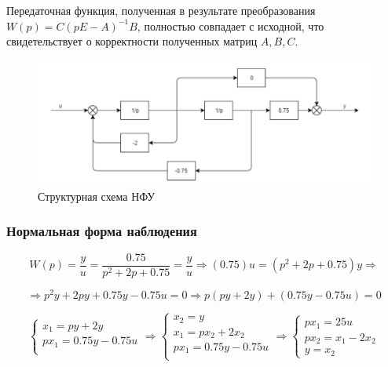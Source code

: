 \documentclass[14pt,a4paper,report]{report}
\begin{document}
Передаточная функция, полученная в результате преобразования $W(p)=C(pE-A)^{-1}B$, полностью совпадает с исходной, что свидетельствует о корректности полученных матриц  $A, B, C$. 

\begin{figure}[h!]
	\centering
	\includegraphics[scale = 0.55]{images/nfu.png}
	\caption{Структурная схема НФУ}
	\label{image:1}
\end{figure}
\newpage
\subsubsection{Нормальная форма наблюдения}

\begin{equation*}
\text{$W(p)=\frac{y}{u}=\frac{0.75}{p^2+2p+0.75}=\frac{y}{u}$}
\Longrightarrow
\text{$(0.75)u=(p^2+2p+0.75)y$}
\Longrightarrow
\end{equation*}

\begin{equation*}
\Longrightarrow
\text{$p^2y+2py+0.75y-0.75u=0$}
\Longrightarrow
\text{$p(py+2y)+(0.75y-0.75u)=0$}
\end{equation*}

\begin{equation*}
\begin{cases}
	\text{$x_1=py+2y$} \\
	\text{$px_1=0.75y-0.75u$} \\
\end{cases}
\Longrightarrow
\begin{cases}
	\text{$x_2=y$}\\
	\text{$x_1=px_2+2	x_2$} \\
	\text{$px_1=0.75y-0.75u$} \\
\end{cases}
\Longrightarrow
\begin{cases}
	\text{$px_1=25u$} \\
	\text{$px_2=x_1-2x_2$} \\
	\text{$y=x_2$}
\end{cases}
\end{equation*}
\end{document}
